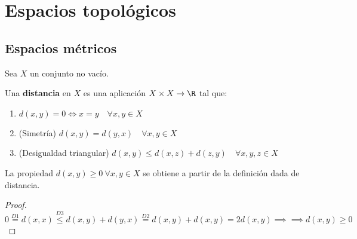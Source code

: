 
\section{Espacios topológicos}
\subsection{Espacios métricos}
Sea $X$ un conjunto no vacío.
\begin{ndef}[Distancia]
  Una \textbf{distancia} en $X$ es una aplicación $X \times X \to \R$ tal que:
  \begin{enumerate}[label=D{{\arabic*}}]
    \item $d(x,y)=0 \Leftrightarrow x=y \quad \forall x,y \in X$
    \item (Simetría) $d(x,y)=d(y,x) \quad \forall x,y \in X$
    \item (Desigualdad triangular) $d(x,y) \le d(x,z)+d(z,y) \quad \forall x,y,z \in X$
  \end{enumerate}
\end{ndef}
\begin{note}
  La propiedad $d(x,y) \geq 0 \ \forall x,y \in X$ se obtiene a partir de la definición dada de distancia.
\end{note}
\begin{proof}
  $0 \stackrel{D1}{=} d(x,x) \stackrel{D3}{\leq} d(x,y)+d(y,x) \stackrel{D2}{=} d(x,y)+d(x,y)=2d(x,y) \implies \implies d(x,y) \geq 0$
\end{proof}

